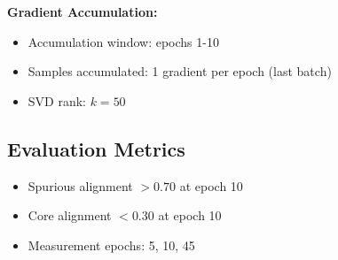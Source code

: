\textbf{Gradient Accumulation:}
\begin{itemize}
    \item Accumulation window: epochs 1-10
    \item Samples accumulated: 1 gradient per epoch (last batch)
    \item SVD rank: $k=50$
\end{itemize}

\subsection{Evaluation Metrics}

\begin{itemize}
    \item Spurious alignment $> 0.70$ at epoch 10
    \item Core alignment $< 0.30$ at epoch 10
    \item Measurement epochs: 5, 10, 45
\end{itemize}
